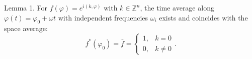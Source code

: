 Lemma 1. For $f(\varphi) = e^{i(k, \varphi)}$ with $k \in \mathbb{Z}^n$, the time average along $\varphi(t) = \varphi_0 + \omega t$ with independent frequencies $\omega_i$ exists and coincides with the space average:
$$f^*(\varphi_0) = \bar{f} = \begin{cases} 1, & k = 0 \\ 0, & k \neq 0 \end{cases}.$$
